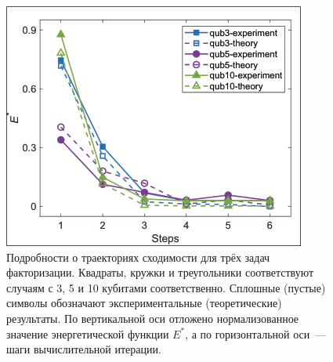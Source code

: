 \begin{figure}
    \centering
    \includegraphics[scale=0.9]{inc/fig_06.png}
    \caption{
    Подробности о траекториях сходимости для трёх задач факторизации. Квадраты,
    кружки и треугольники соответствуют случаям с 3, 5 и 10 кубитами
    соответственно. Сплошные (пустые) символы обозначают экспериментальные
    (теоретические) результаты. По вертикальной оси отложено нормализованное
    значение энергетической функции $E^{*}$, а по горизонтальной оси — шаги
    вычислительной итерации.
    }
    \label{fig:fig06}
\end{figure}

